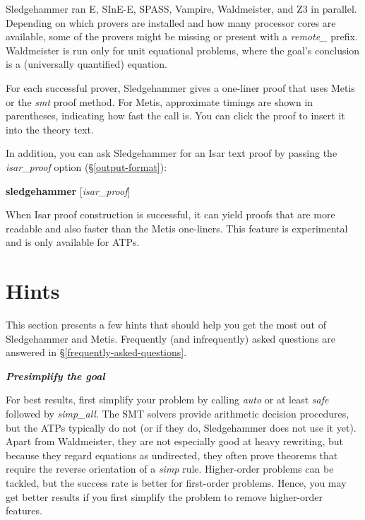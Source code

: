 \documentclass[a4paper,12pt]{article}
\begin{document}
Sledgehammer ran E, SInE-E, SPASS, Vampire, Waldmeister, and Z3 in parallel.
Depending on which provers are installed and how many processor cores are
available, some of the provers might be missing or present with a
\textit{remote\_} prefix. Waldmeister is run only for unit equational problems,
where the goal's conclusion is a (universally quantified) equation.

For each successful prover, Sledgehammer gives a one-liner proof that uses Metis
or the \textit{smt} proof method. For Metis, approximate timings are shown in
parentheses, indicating how fast the call is. You can click the proof to insert
it into the theory text.

In addition, you can ask Sledgehammer for an Isar text proof by passing the
\textit{isar\_proof} option (\S\ref{output-format}):

\prew
\textbf{sledgehammer} [\textit{isar\_proof}]
\postw

When Isar proof construction is successful, it can yield proofs that are more
readable and also faster than the Metis one-liners. This feature is experimental
and is only available for ATPs.

\section{Hints}
\label{hints}

This section presents a few hints that should help you get the most out of
Sledgehammer and Metis. Frequently (and infrequently) asked questions are
answered in \S\ref{frequently-asked-questions}.

\newcommand\point[1]{\medskip\par{\sl\bfseries#1}\par\nopagebreak}

\point{Presimplify the goal}

For best results, first simplify your problem by calling \textit{auto} or at
least \textit{safe} followed by \textit{simp\_all}. The SMT solvers provide
arithmetic decision procedures, but the ATPs typically do not (or if they do,
Sledgehammer does not use it yet). Apart from Waldmeister, they are not
especially good at heavy rewriting, but because they regard equations as
undirected, they often prove theorems that require the reverse orientation of a
\textit{simp} rule. Higher-order problems can be tackled, but the success rate
is better for first-order problems. Hence, you may get better results if you
first simplify the problem to remove higher-order features.
\end{document}
